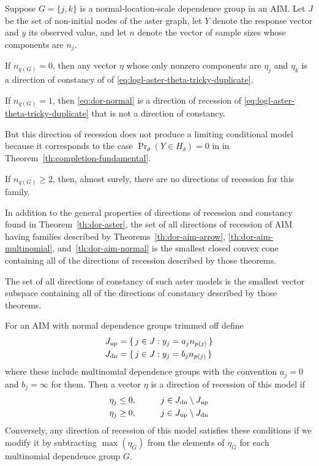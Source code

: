 \begin{theorem} \label{th:dor-aim-normal}
Suppose $G = \{j, k\}$ is a normal-location-scale dependence group
in an AIM.
Let $J$ be the set of non-initial nodes of the aster graph,
let $Y$ denote the response vector and $y$ its observed value,
and let $n$ denote the vector of sample sizes whose components are $n_j$.

If $n_{q(G)} = 0$, then any vector $\eta$ whose only nonzero components
are $\eta_j$ and $\eta_k$ is a direction of constancy of
of \eqref{eq:logl-aster-theta-tricky-duplicate}.

If $n_{q(G)} = 1$, then \eqref{eq:dor-normal} is a direction of recession
of \eqref{eq:logl-aster-theta-tricky-duplicate}
that is not a direction of constancy.

But this direction of recession does not produce a limiting conditional model
because it corresponds to the case $\Pr_\theta(Y \in H_\delta) = 0$ in
in Theorem~\ref{th:completion-fundamental}.

If $n_{q(G)} \ge 2$, then, almost surely,
there are no directions of recession for this family.
\end{theorem}

\begin{theorem} \label{th:dor-aim}
In addition to the general properties of directions of recession
and constancy found in Theorem~\ref{th:dor-aster},
the set of all directions of recession of AIM
having families described by Theorems~\ref{th:dor-aim-arrow},
\ref{th:dor-aim-multinomial}, and~\ref{th:dor-aim-normal}
is the smallest closed convex cone containing all of the directions
of recession described by those theorems.

The set of all directions of constancy of such aster models
is the smallest vector subspace containing all of the directions
of constancy described by those theorems.
\end{theorem}

\begin{theorem} \label{th:dor-aim-explicit}
For an AIM with normal dependence groups trimmed off define
\begin{align*}
   J_\text{\normalfont up}
   & =
   \{\,  j \in J : y_j = a_j n_{p(j)}  \,\}
   \\
   J_\text{\normalfont dn}
   & =
   \{\,  j \in J : y_j = b_j n_{p(j)}  \,\}
\end{align*}
where these include multinomial dependence groups with the convention
$a_j = 0$ and $b_j = \infty$ for them.
Then a vector $\eta$ is a direction of recession of this model if
\begin{alignat*}{2}
   \eta_j & \le 0, & \qquad &
   j \in J_\text{\normalfont dn} \setminus J_\text{\normalfont up}
   \\
   \eta_j & \ge 0, & \qquad &
   j \in J_\text{\normalfont up} \setminus J_\text{\normalfont dn}
\end{alignat*}
Conversely, any direction of recession of this model satisfies these
conditions if we modify it by subtracting $\max(\eta_G)$ from the elements
of $\eta_G$ for each multinomial dependence group $G$.
\end{theorem}
